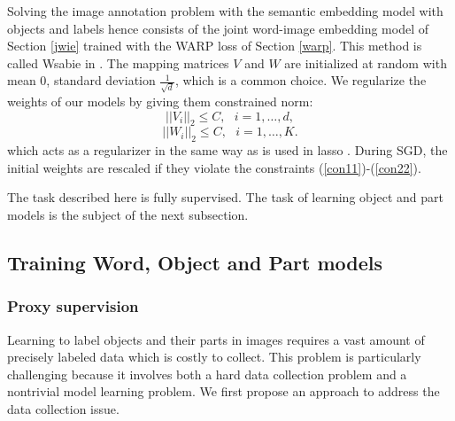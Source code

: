Solving the image annotation problem with the semantic embedding model with objects and labels
hence consists of the
 joint word-image embedding model of Section \ref{jwie} trained with the WARP loss of Section \ref{warp}.
This method is called {\sc Wsabie} in \citep{image-wsabie}.
The mapping matrices $V$ and $W$ are initialized at random
with mean 0, standard deviation $\frac{1}{\sqrt{d}}$, which is a common choice. 
We regularize the weights of our models by giving them constrained norm:
\begin{equation} \label{con11}
  ||V_i||_2 \leq C, ~~~ i=1,\dots,d,
\end{equation}
\begin{equation} \label{con22}
  ||W_i||_2 \leq C, ~~~ i=1,\dots,K.
\end{equation}
which acts as a regularizer in the same way as is used in lasso \citep{tibshirani1996regression}.
During SGD, the initial weights are rescaled if they violate the constraints (\ref{con11})-(\ref{con22}).

The task described here is fully supervised. 
The task of  learning object and part models is the subject of the next subsection.

\subsection{Training Word, Object and Part models}\label{sec:psup}

\subsubsection{Proxy supervision}

Learning to label objects and their parts in images requires a vast
amount of precisely labeled data which is costly to collect.  This
problem is particularly challenging because it involves both a hard
data collection problem and a nontrivial model learning problem.  We
first propose an approach to address the data collection issue.


